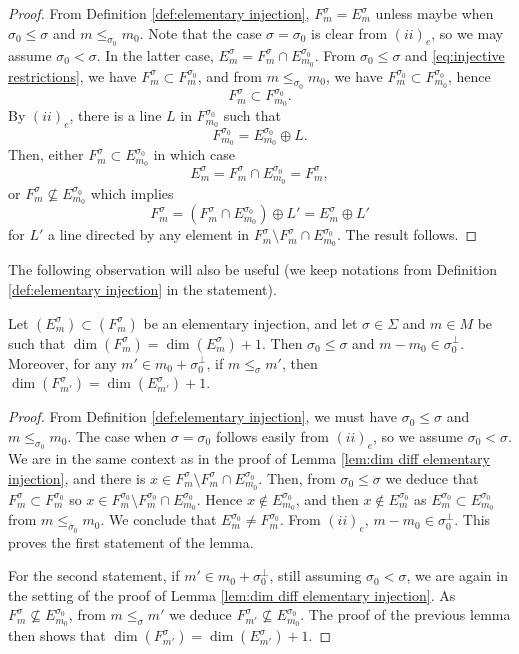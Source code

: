 \documentclass[a4paper,10pt]{amsart}
\theoremstyle{plain}{
    \newtheorem{theorem}{Theorem}[section]
    \newtheorem{lemma}[theorem]{Lemma}
    \newtheorem{corollary}[theorem]{Corollary}
    \newtheorem{proposition}[theorem]{Proposition}
    \newtheorem{conjecture}[theorem]{Conjecture}
}
\theoremstyle{definition}{
    \newtheorem{definition}[theorem]{Definition}
    \newtheorem{defn-thm}[theorem]{Definition-Theorem}
    \newtheorem{example}[theorem]{Example}
    \newtheorem{notation}[theorem]{Notation}
}
\theoremstyle{remark}{
    \newtheorem{remark}[theorem]{Remark}
    \newtheorem{problem}[theorem]{Problem}
    \newtheorem{question}[theorem]{Question}
}
\begin{document}
\begin{proof}
From Definition \ref{def:elementary injection}, $F^\sigma_m=E^\sigma_m$ unless maybe when   $\sigma_0\leq \sigma$ and $m\leq_{\sigma_0} m_0$. Note that the case $\sigma=\sigma_0$ is clear from $(ii)_e$, so we may assume $\sigma_0<\sigma$. In the latter case, $E^\sigma_m=F^\sigma_m\cap E^{\sigma_0}_{m_0}$. From $\sigma_0\leq \sigma$ and \eqref{eq:injective restrictions}, we have $F^\sigma_m\subset F^{\sigma_0}_m$, and from $m\leq_{\sigma_0} m_0$, we have $F^{\sigma_0}_{m}\subset F^{\sigma_0}_{m_0}$, hence 
$$F^{\sigma}_{m}\subset F^{\sigma_0}_{m_0}.$$
By $(ii)_e$, there is a line $L$ in $F^{\sigma_0}_{m_0}$ such that
$$
F^{\sigma_0}_{m_0}=E^{\sigma_0}_{m_0}\oplus L.
$$
Then, either $F^\sigma_m\subset E^{\sigma_0}_{m_0}$ in which case 
$$
E^\sigma_m=F^\sigma_m\cap E^{\sigma_0}_{m_0}=F^\sigma_m,
$$
or $F^\sigma_m\nsubseteq E^{\sigma_0}_{m_0}$ which implies
$$
F^\sigma_m=(F^\sigma_m\cap E^{\sigma_0}_{m_0})\oplus L'=E^\sigma_m\oplus L'
$$
for $L'$ a line directed by any element in $F^\sigma_m\setminus F^\sigma_m\cap E^{\sigma_0}_{m_0}$. The result follows.
\end{proof}
The following observation will also be useful (we keep notations from Definition \ref{def:elementary injection} in the statement).
\begin{lemma}
 \label{lem:precise when dim diff}
 Let $(E^\sigma_m)\subset (F^\sigma_m)$ be an elementary injection, and let $\sigma\in\Sigma$ and $m\in M$ be such that $\dim(F^\sigma_m)=\dim(E^\sigma_m)+1$. Then $\sigma_0\leq \sigma$ and $m-m_0\in\sigma_0^\perp$. Moreover, for any $m'\in m_0+\sigma_0^\perp$, if $m\leq_\sigma m'$, then  $\dim(F^\sigma_{m'})=\dim(E^\sigma_{m'})+1$.
\end{lemma}
\begin{proof}
 From Definition \ref{def:elementary injection}, we must have $\sigma_0\leq \sigma$  and $m\leq_{\sigma_0} m_0$. The case when $\sigma=\sigma_0$ follows easily from $(ii)_e$, so we assume $\sigma_0<\sigma$. We are in the same context as in the proof of Lemma \ref{lem:dim diff elementary injection}, and there is $x\in  F^\sigma_m\setminus F^\sigma_m\cap E^{\sigma_0}_{m_0}$. Then, from $\sigma_0\leq \sigma$   we deduce that $F^\sigma_m\subset F^{\sigma_0}_{m}$ so $x\in  F^{\sigma_0}_m\setminus F^{\sigma_0}_m\cap E^{\sigma_0}_{m_0}$. Hence $x\notin E^{\sigma_0}_{m_0}$, and then $x\notin E^{\sigma_0}_{m}$ as $E^{\sigma_0}_{m}\subset E^{\sigma_0}_{m_0}$ from $m\leq_{\sigma_0} m_0$. We conclude that $E^{\sigma_0}_{m}\neq F^{\sigma_0}_{m}$. From $(ii)_e$, $m-m_0\in\sigma_0^\perp$. This proves the first statement of the lemma.
 
 For the second statement, if $m'\in m_0+\sigma_0^\perp$, still assuming $\sigma_0<\sigma$, we are again in the setting of the proof of Lemma \ref{lem:dim diff elementary injection}. As $F^\sigma_m\nsubseteq E^{\sigma_0}_{m_0}$, from $m\leq_\sigma m'$ we deduce $F^\sigma_{m'}\nsubseteq E^{\sigma_0}_{m_0}$. The proof of the previous lemma then shows that $\dim(F^\sigma_{m'})=\dim(E^\sigma_{m'})+1$.
\end{proof}
\end{document}
